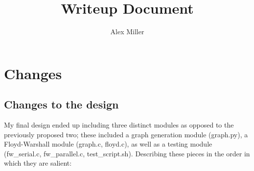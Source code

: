 \documentclass[]{article}
\title{Writeup Document}
\author{Alex Miller}
\begin{document}
	\maketitle

\section{Changes}
	\subsection{Changes to the design}
	My final design ended up including three distinct modules as opposed to the previously proposed two; these included a graph generation module (graph.py), a Floyd-Warshall module (graph.c, floyd.c), as well as a testing module (fw\_serial.c, fw\_parallel.c, test\_script.sh). Describing these pieces in the order in which they are salient:
\end{document}
